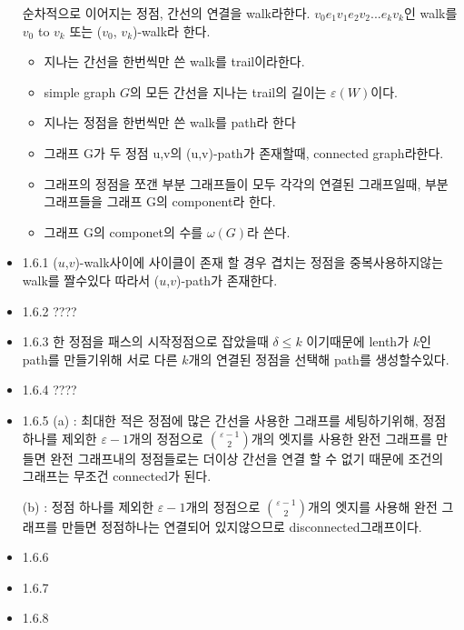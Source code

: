 \documentclass{oblivoir}
\begin{document}
\begin{itemize}
    \begin{dfn}[walk]순차적으로 이어지는 정점, 간선의 연결을 walk라한다. $v_{0}e_{1}v_{1}e_{2}v_{2} ... e_{k}v_{k}$인 walk를 $v_0$ to $v_k$ 또는 ($v_0$, $v_k$)-walk라 한다.
        \begin{itemize}
            \item 지나는 간선을 한번씩만 쓴 walk를 trail이라한다.
            \item simple graph $G$의 모든 간선을 지나는 trail의 길이는 $\varepsilon (W)$이다.
            \item 지나는 정점을 한번씩만 쓴 walk를 path라 한다
            \item 그래프 G가 두 정점 u,v의  (u,v)-path가 존재할때, connected graph라한다.
            \item 그래프의 정점을 쪼갠 부분 그래프들이 모두 각각의 연결된 그래프일때, 부분 그래프들을 그래프 G의 component라 한다.
            \item 그래프 G의 componet의 수를 $\omega(G)$라 쓴다.
        \end{itemize}
    \end{dfn}
    \item 1.6.1 ($u$,$v$)-walk사이에 사이클이 존재 할 경우 겹치는 정점을 중복사용하지않는 walk를 짤수있다 따라서 ($u$,$v$)-path가 존재한다.
    
    \item 1.6.2
    ????
    \item 1.6.3
    한 정점을 패스의 시작정점으로 잡았을때 $\delta \le k$ 이기때문에  lenth가 $k$인 path를 만들기위해 서로 다른 $k$개의 연결된 정점을 선택해 path를 생성할수있다.
    
    \item 1.6.4
    ????
    \item 1.6.5
    (a) : 최대한 적은 정점에 많은 간선을 사용한 그래프를 세팅하기위해,  정점 하나를 제외한 $\varepsilon-1$개의 정점으로 ${\varepsilon-1 \choose 2}$개의 엣지를 사용한 완전 그래프를 만들면 완전 그래프내의 정점들로는 더이상 간선을 연결 할 수 없기 때문에 조건의 그래프는 무조건 connected가 된다.

    (b) : 정점 하나를 제외한 $\varepsilon-1$개의 정점으로 ${\varepsilon-1 \choose 2}$개의 엣지를 사용해 완전 그래프를 만들면 정점하나는 연결되어 있지않으므로 disconnected그래프이다.

    \item 1.6.6
    \item 1.6.7

    \item 1.6.8


\end{itemize}
\end{document}
